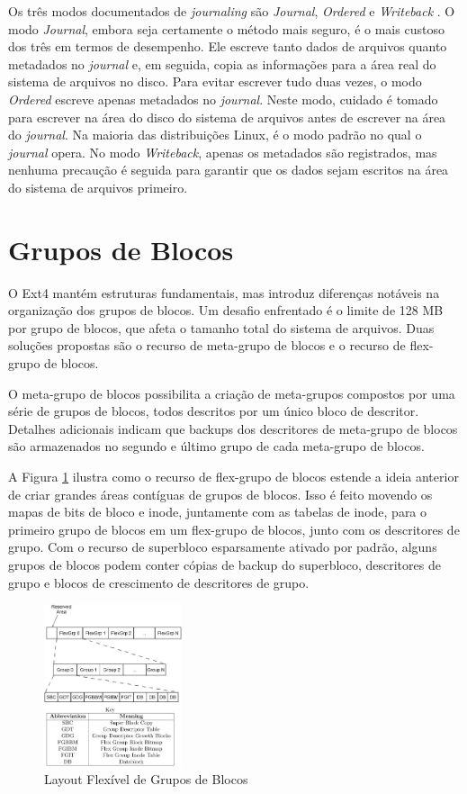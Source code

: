 \documentclass[
	12pt,				%
	openright,			%
	oneside,			%
	a4paper,			%
	chapter=TITLE,		%
	english,			%
	french,				%
	spanish,			%
	brazil				%
	]{abntex2}
\theoremstyle{definition}
\begin{document}
Os três modos documentados de \textit{journaling} são \textit{Journal}, \textit{Ordered} e 
\textit{Writeback} \cite{bovet_cesati_2005}. O modo \textit{Journal}, embora seja certamente 
o método mais seguro, é o mais custoso dos três em termos de desempenho. Ele escreve tanto dados 
de arquivos quanto metadados no \textit{journal} e, em seguida, copia as informações para a área real do sistema de arquivos no disco. Para evitar escrever tudo duas vezes, o modo \textit{Ordered} escreve apenas metadados no \textit{journal}. Neste modo, cuidado é tomado para escrever na área do disco do sistema de arquivos antes de escrever na área do \textit{journal}. Na maioria das distribuições Linux, é o modo padrão no qual o \textit{journal} opera. No modo \textit{Writeback}, apenas os metadados são registrados, mas nenhuma precaução é seguida para garantir que os dados sejam escritos na área do sistema de arquivos primeiro.


\section{Grupos de Blocos}
O Ext4 mantém estruturas fundamentais, mas introduz diferenças notáveis na organização dos grupos 
de blocos. Um desafio enfrentado é o limite de 128 MB por grupo de blocos, que afeta o tamanho total 
do sistema de arquivos. Duas soluções propostas são o recurso de meta-grupo de blocos e o recurso de 
flex-grupo de blocos.

O meta-grupo de blocos possibilita a criação de meta-grupos compostos por uma série de grupos de 
blocos, todos descritos por um único bloco de descritor. Detalhes adicionais indicam que backups 
dos descritores de meta-grupo de blocos são armazenados no segundo e último grupo de cada meta-grupo de blocos.

A Figura \ref{fig:9} ilustra como o recurso de flex-grupo de blocos estende a ideia anterior 
de criar grandes áreas contíguas de grupos de blocos. Isso é feito movendo os mapas de bits de bloco e 
inode, juntamente com as tabelas de inode, para o primeiro grupo de blocos em um flex-grupo de blocos, 
junto com os descritores de grupo. Com o recurso de superbloco esparsamente ativado por padrão, alguns
grupos de blocos podem conter cópias de backup do superbloco, descritores de grupo e blocos de 
crescimento de descritores de grupo.

\begin{figure}[H]
	\centering
	\includegraphics[width=0.36\textwidth]{fig9.jpg}
	\caption{Layout Flexível de Grupos de Blocos}
	\label{fig:9}
\end{figure}
\end{document}
